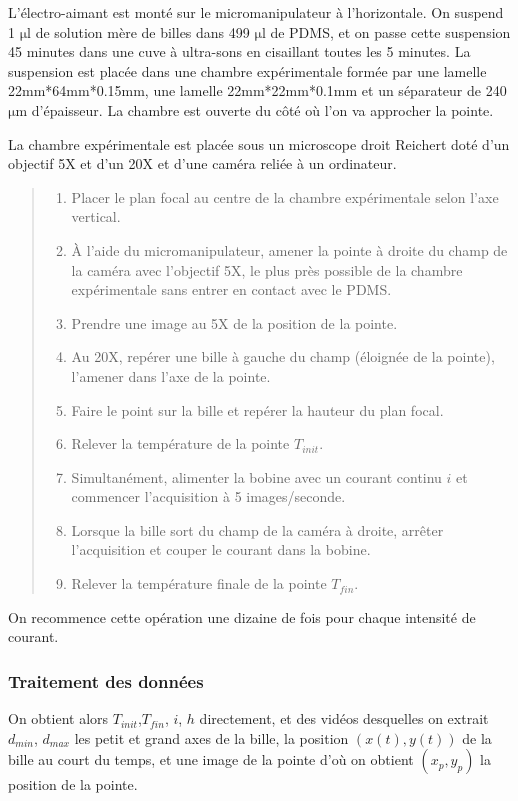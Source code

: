 \documentclass{report}
\newcommand{\micro}{$\mathrm{\mu}$}
\begin{document}
 
 L'électro-aimant est monté sur le micromanipulateur à l'horizontale.  
 On suspend 1 \micro l de solution mère de billes dans 499 \micro l de PDMS, et on passe cette suspension 45 minutes dans une cuve à ultra-sons en cisaillant toutes les 5 minutes.
 La suspension est placée dans une chambre expérimentale formée par une lamelle 22mm*64mm*0.15mm, une lamelle 22mm*22mm*0.1mm et un séparateur de 240 \micro m d'épaisseur. La chambre est ouverte du côté où l'on va approcher la pointe. 
 
 La chambre expérimentale est placée sous un microscope droit Reichert doté d'un objectif 5X et d'un 20X et d'une caméra reliée à un ordinateur.
 
 \begin{quote}
 \begin{enumerate}
 \item Placer le plan focal au centre de la chambre expérimentale selon l'axe vertical.
 \item \`A l'aide du micromanipulateur, amener la pointe à droite du champ de la caméra avec l'objectif 5X, le plus près possible de la chambre expérimentale sans entrer en contact avec le PDMS. 
 \item Prendre une image au 5X de la position de la pointe.
 \item Au 20X, repérer une bille à gauche du champ (éloignée de la pointe), l'amener dans l'axe de la pointe. 
 \item Faire le point sur la bille et repérer la hauteur du plan focal. 
 \item Relever la température de la pointe $T_{init}$.
 \item Simultanément, alimenter la bobine avec un courant continu $i$ et commencer l'acquisition à 5 images/seconde. 
 \item Lorsque la bille sort du champ de la caméra à droite, arrêter l'acquisition et couper le courant dans la bobine.
 \item Relever la température finale de la pointe $T_{fin}$.
 \end{enumerate}
 \end{quote}
 
 On recommence cette opération une dizaine de fois pour chaque intensité de courant. 
 
 \subsubsection{Traitement des données}
 On obtient alors $T_{init}$,$T_{fin}$, $i$, $h$ directement, et des vidéos desquelles on extrait $d_{min}$, $d_{max}$ les petit et grand axes de la bille, la position $(x(t),y(t))$ de la bille au court du temps, et une image de la pointe d'où on obtient $(x_p,y_p)$ la position de la pointe. 
 
\end{document}
